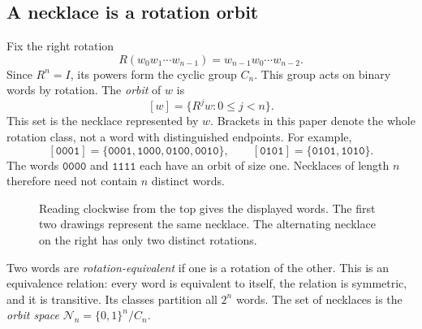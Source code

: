 \documentclass[11pt]{article}
\theoremstyle{definition}
\newcommand{\neck}[1]{[\mathtt{#1}]}
\newcommand{\word}[1]{\mathtt{#1}}
\numberwithin{equation}{section}
\begin{document}
\subsection{A necklace is a rotation orbit}

Fix the right rotation
\begin{equation}\label{eq:rotation}
 R(w_0w_1\cdots w_{n-1})=w_{n-1}w_0\cdots w_{n-2}.
\end{equation}
Since $R^n=I$, its powers form the cyclic group $C_n$. This group acts
on binary words by rotation. The \emph{orbit} of $w$ is
\begin{equation}\label{eq:necklace}
 [w]=\{R^j w:0\le j<n\}.
\end{equation}
This set is the necklace represented by $w$. Brackets in this paper
denote the whole rotation class, not a word with distinguished endpoints.
For example,
\[
 \neck{0001}=\{\word{0001},\word{1000},\word{0100},\word{0010}\},
 \qquad
 \neck{0101}=\{\word{0101},\word{1010}\}.
\]
The words $\word{0000}$ and $\word{1111}$ each have an orbit of size one.
Necklaces of length $n$ therefore need not contain $n$ distinct words.

\begin{figure}[htbp]
\centering
{}
\caption{Reading clockwise from the top gives the displayed words. The
first two drawings represent the same necklace. The alternating necklace
on the right has only two distinct rotations.}
\label{fig:rings}
\end{figure}

Two words are \emph{rotation-equivalent} if one is a rotation of the
other. This is an equivalence relation: every word is equivalent to
itself, the relation is symmetric, and it is transitive. Its classes
partition all $2^n$ words. The set of necklaces is the \emph{orbit space}
$\mathcal N_n=\{0,1\}^n/C_n$.
\end{document}
